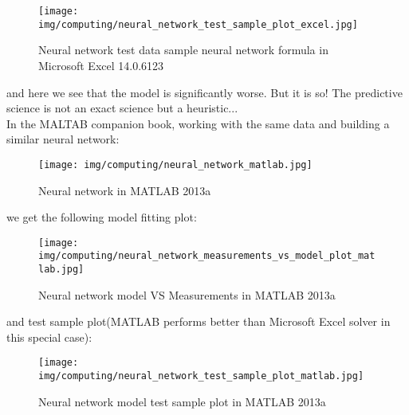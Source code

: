 	\begin{tcolorbox}[colframe=black,colback=white,sharp corners]
	\begin{figure}[H]
		\centering
		\texttt{[image: img/computing/neural\_network\_test\_sample\_plot\_excel.jpg]}
		\caption[]{Neural network test data sample neural network formula in Microsoft Excel 14.0.6123}
	\end{figure}
	and here we see that the model is significantly worse. But it is so! The predictive science is not an exact science but a heuristic...\\
	
	In the MALTAB companion book, working with the same data and building a similar neural network:
	\begin{figure}[H]
		\centering
		\texttt{[image: img/computing/neural\_network\_matlab.jpg]}
		\caption{Neural network in MATLAB 2013a}
	\end{figure}
	we get the following model fitting plot:
	\end{tcolorbox}
	
	\begin{tcolorbox}[colframe=black,colback=white,sharp corners]
	\begin{figure}[H]
		\centering
		\texttt{[image: img/computing/neural\_network\_measurements\_vs\_model\_plot\_matlab.jpg]}
		\caption[]{Neural network model VS Measurements in MATLAB  2013a}
	\end{figure}
	and test sample plot(MATLAB performs better than Microsoft Excel solver in this special case):
	\begin{figure}[H]
		\centering
		\texttt{[image: img/computing/neural\_network\_test\_sample\_plot\_matlab.jpg]}
		\caption[]{Neural network model test sample plot in MATLAB  2013a}
	\end{figure}
	\end{tcolorbox}
	
	
